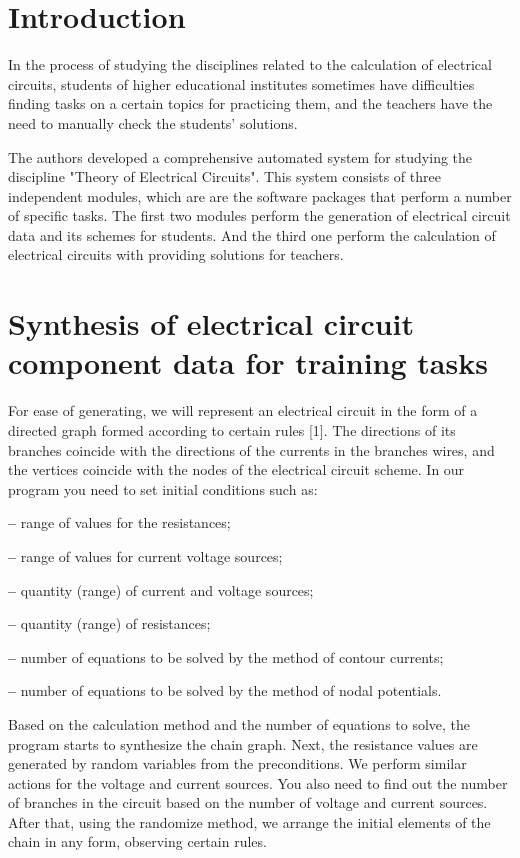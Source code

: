 \documentclass[a4paper,10pt,twoside]{article}
\begin{document}
\begin{multicols}{2} 


\section*{Introduction}
In the process of studying the disciplines related to the calculation of electrical circuits, students of higher educational institutes sometimes have difficulties finding tasks on a certain topics for practicing them, and the teachers have the need to manually check the students' solutions.

The authors developed a comprehensive automated system for studying the discipline "Theory of Electrical Circuits". This system consists of three independent modules, which are are the software packages that perform a number of specific tasks. The first two modules perform the generation of electrical circuit data and its schemes for students. And the third one perform the calculation of electrical circuits with providing solutions for teachers.

\section{Synthesis of electrical circuit component data for training tasks}
For ease of generating, we will represent an electrical circuit in the form of a directed graph formed according to certain rules [1]. The directions of its branches coincide with the directions of the currents in the branches wires, and the vertices coincide with the nodes of the electrical circuit scheme. In our program you need to set initial conditions such as:

\textbf{--} range of values for the resistances;

\textbf{--} range of values for current voltage sources;

\textbf{--} quantity (range) of current and voltage sources;

\textbf{--} quantity (range) of resistances;

\textbf{--} number of equations to be solved by the method of contour currents;

\textbf{--} number of equations to be solved by the method of nodal potentials.

Based on the calculation method and the number of equations to solve, the program starts to synthesize the chain graph. Next, the resistance values are generated by random variables from the preconditions. We perform similar actions for the voltage and current sources. You also need to find out the number of branches in the circuit based on the number of voltage and current sources. After that, using the randomize method, we arrange the initial elements of the chain in any form, observing certain rules.


\end{multicols}
\end{document}
